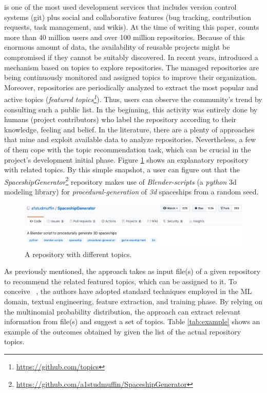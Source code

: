 \GH is one of the most used development services that includes version control 
systems (\ie git) plus social and collaborative features (\eg bug tracking, 
contribution requests, task management, and wikis).
At the time of writing this paper, \GH counts more than 40 million users and 
over 100 million repositories. Because of this enormous amount of data, the 
availability of reusable projects might be compromised if they cannot be 
suitably discovered. In recent years, \GH introduced a  mechanism based on 
topics to explore repositories. The managed \GH repositories are being continuously 
monitored and assigned topics to improve their organization. Moreover, 
repositories are periodically analyzed to extract the most popular and active 
topics (\ie \emph{featured topics\footnote{\url{https://github.com/topics}}}). 
Thus, users can observe the community's trend by consulting such a public list. 
In the beginning, this activity was entirely done by humans (\ie project 
contributors) who label the repository according to their knowledge, feeling 
and belief. In the literature, there are a plenty of approaches that mine and exploit available 
data to analyze repositories. Nevertheless, a few of them cope with the topic 
recommendation task, which can be crucial in the project's development initial 
phase. Figure \ref{fig:SpaceshipGenerator} shows an explanatory repository with 
related topics. By this simple snapshot, a \GH user can figure out that the 
\emph{SpaceshipGenerator}\footnote{\label{note:spaceship}\url{https://github.com/a1studmuffin/SpaceshipGenerator}}
 repository makes use of \emph{Blender-scripts} (\ie a \emph{python} 3d 
modeling library) for \emph{procedural-generation} of \emph{3d} spaceships from 
a random seed.


\begin{figure}[h!]
    \centering
    \includegraphics[width=0.99\linewidth]{figs/SpaceshipGenerator.png}
    \caption{A \GH repository with different topics.}
    \label{fig:SpaceshipGenerator}
\end{figure}


As previously mentioned, the \MNB approach takes as input \RM file(s) of a given 
repository to recommend the related featured topics, which can be assigned to 
it. To conceive \MNB~\cite{10.1145/3383219.3383227}, the authors have adopted standard techniques employed in the 
ML domain, \ie textual engineering, feature extraction, and training phase. By 
relying on the multinomial probability distribution, the approach can extract 
relevant information from \RM file(s) and suggest a set of topics. Table 
\ref{tab:example} shows an example of the outcomes obtained by \MNB given the list of the actual repository topics. 

